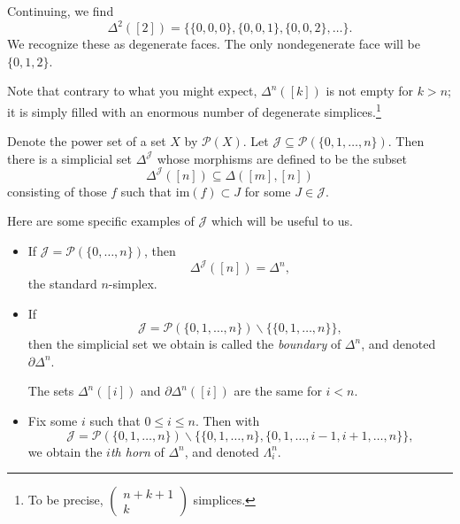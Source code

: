 \documentclass[main.tex]{subfiles}
\begin{document}
Continuing, we find
\begin{equation*}
  \Delta^{2}([2]) = \{\{0,0,0\}, \{0,0,1\}, \{0,0,2\}, \ldots\}.
\end{equation*}
We recognize these as degenerate faces. The only nondegenerate face will be $\{0,1,2\}$.

Note that contrary to what you might expect, $\Delta^{n}([k])$ is not empty for $k > n$; it is simply filled with an enormous number of degenerate simplices.\footnote{To be precise, $\begin{pmatrix} n+k+1 \\ k \end{pmatrix}$ simplices.}

\begin{example}
  Denote the power set of a set $X$ by $\mathcal{P}(X)$. Let $\mathcal{J} \subseteq \mathcal{P}(\{0, 1, \ldots, n\})$. Then there is a simplicial set $\Delta^{\mathcal{J}}$ whose morphisms are defined to be the subset
  \begin{equation*}
    \Delta^{\mathcal{J}}([n]) \subseteq \Delta([m], [n])
  \end{equation*}
  consisting of those $f$ such that $\mathrm{im}(f) \subset J$ for some $J \in \mathcal{J}$.

  Here are some specific examples of $\mathcal{J}$ which will be useful to us. \begin{itemize}
    \item If $\mathcal{J} = \mathcal{P}(\{0, \ldots, n\})$, then
      \begin{equation*}
        \Delta^{\mathcal{J}}([n]) = \Delta^{n},
      \end{equation*}
      the standard $n$-simplex.

    \item If
      \begin{equation*}
        \mathcal{J} = \mathcal{P}(\{0, 1, \ldots, n\}) \smallsetminus \{\{0, 1, \ldots, n\}\},
      \end{equation*}
      then the simplicial set we obtain is called the \emph{boundary} of $\Delta^{n}$, and denoted $\partial \Delta^{n}$.

      The sets $\Delta^{n}([i])$ and $\partial \Delta^{n}([i])$ are the same for $i < n$.

    \item Fix some $i$ such that $0 \leq i \leq n$. Then with
      \begin{equation*}
        \mathcal{J} = \mathcal{P}(\{0, 1, \ldots, n\}) \smallsetminus \{\{0, 1, \ldots, n\}, \{0, 1, \ldots, i - 1, i + 1, \ldots, n\}\},
      \end{equation*}
      we obtain the \emph{$i$th horn} of $\Delta^{n}$, and denoted $\Lambda^{n}_{i}$.


\end{itemize}
\end{example}
\end{document}
